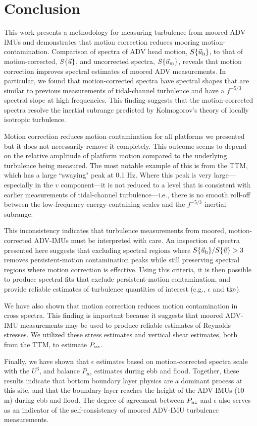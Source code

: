 
\section{Conclusion}
\label{sec:conclusion}
 
This work presents a methodology for measuring turbulence from moored ADV-IMUs and demonstrates that motion correction reduces mooring motion-contamination. Comparison of spectra of ADV head motion, $S\{\vec{u}_\mathrm{h}\}$, to that of motion-corrected, $S\{\vec{u}\}$, and uncorrected spectra, $S\{\vec{u}_\mathrm{m}\}$, reveals that motion correction improves spectral estimates of moored ADV measurements. In particular, we found that motion-corrected spectra have spectral shapes that are similar to previous measurements of tidal-channel turbulence and have a $f^{-5/3}$ spectral slope at high frequencies. This finding suggests that the motion-corrected spectra resolve the inertial subrange predicted by Kolmogorov's theory of locally isotropic turbulence.

Motion correction reduces motion contamination for all platforms we presented but it does not necessarily remove it completely. This outcome seems to depend on the relative amplitude of platform motion compared to the underlying turbulence being measured. The most notable example of this is from the TTM, which has a large ``swaying" peak at 0.1 Hz. Where this peak is very large---especially in the $v$ component---it is not reduced to a level that is consistent with earlier measurements of tidal-channel turbulence---i.e., there is no smooth roll-off between the low-frequency energy-containing scales and the $f^{-5/3}$ inertial subrange.

This inconsistency indicates that turbulence measurements from moored, motion-corrected ADV-IMUs must be interpreted with care. An inspection of spectra presented here suggests that excluding spectral regions where $S\{\vec{u}_\mathrm{h}\} / S\{\vec{u}\} > 3$ removes persistent-motion contamination peaks while still preserving spectral regions where motion correction is effective. Using this criteria, it is then possible to produce spectral fits that exclude persistent-motion contamination, and provide reliable estimates of turbulence quantities of interest (e.g., $\epsilon$ and $\mathrm{tke}$).

We have also shown that motion correction reduces motion contamination in cross spectra. This finding is important because it suggests that moored ADV-IMU measurements may be used to produce reliable estimates of Reynolds stresses. We utilized these stress estimates and vertical shear estimates, both from the TTM, to estimate $P_{uz}$. 

Finally, we have shown that $\epsilon$ estimates based on motion-corrected spectra scale with the $U^3$, and balance $P_{uz}$ estimates during ebb and flood. Together, these results indicate that bottom boundary layer physics are a dominant process at this site, and that the boundary layer reaches the height of the ADV-IMUs (10 m) during ebb and flood. The degree of agreement between $P_{uz}$ and $\epsilon$ also serves as an indicator of the self-consistency of moored ADV-IMU turbulence measurements. 

